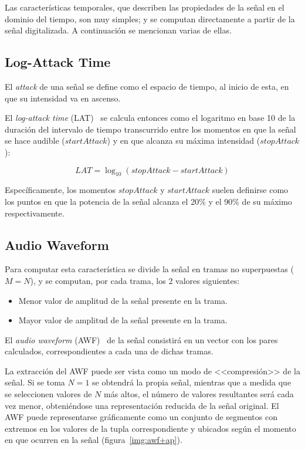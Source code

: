 Las características temporales, que describen las propiedades de la señal en el dominio del tiempo, son muy simples;
y se computan directamente a partir de la señal digitalizada.
A continuación se mencionan varias de ellas.

\subsection{Log-Attack Time}\label{subsec:log-attackTime}

El \textit{attack} de una señal se define como el espacio de tiempo, al inicio de esta, en que su intensidad va en ascenso.

El \textit{log-attack time} (LAT)~\cite{Gunasekaran11,Kim05,Manjunath02,Peters04} se calcula entonces como el logaritmo en base 10 de la duración del intervalo de tiempo transcurrido entre los momentos en que la señal se hace audible ($startAttack$) y en que alcanza su máxima intensidad ($stopAttack$):

\begin{equation}
    \label{eq:LAT}
    LAT = \log_{10}{(stopAttack - startAttack)}
\end{equation}

Específicamente, los momentos $stopAttack$ y $startAttack$ suelen definirse como los puntos en que la potencia de la señal alcanza el 20\% y el 90\% de su máximo respectivamente.

\subsection{Audio Waveform}\label{subsec:audioWaveform}

Para computar esta característica se divide la señal en tramas no superpuestas ($M = N$), y se computan, por cada trama, los 2 valores siguientes:

\begin{itemize}
    \item Menor valor de amplitud de la señal presente en la trama.
    \item Mayor valor de amplitud de la señal presente en la trama.
\end{itemize}

El \textit{audio waveform} (AWF)~\cite{Kim05,Manjunath02} de la señal consistirá en un vector con los pares calculados, correspondientes a cada una de dichas tramas.

La extracción del AWF puede ser vista como un modo de <<compresión>> de la señal.
Si se toma $N=1$ se obtendrá la propia señal, mientras que a medida que se seleccionen valores de $N$ más altos, el número de valores resultantes será cada vez menor, obteniéndose una representación reducida de la señal original.
El AWF puede representarse gráficamente como un conjunto de segmentos con extremos en los valores de la tupla correspondiente y ubicados según el momento en que ocurren en la señal (figura~\ref{img:awf+ap}).

